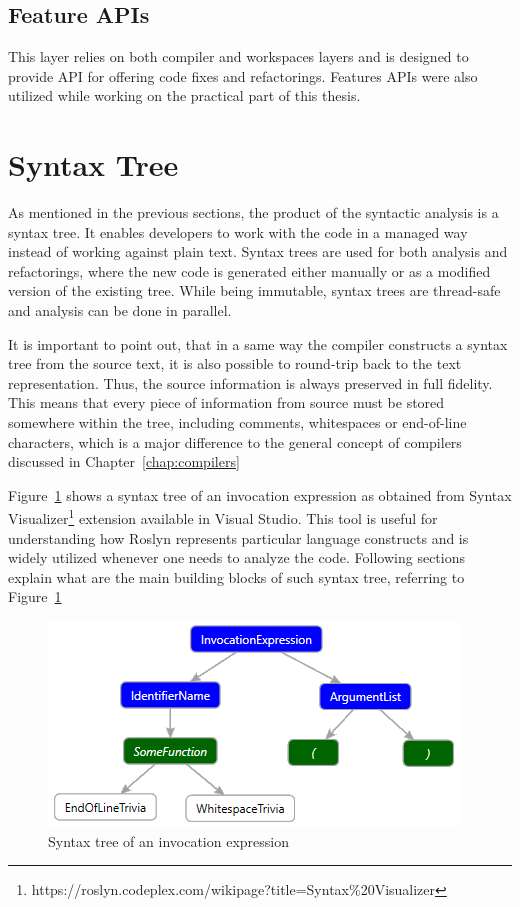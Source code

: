 \documentclass[
  digital, %
  table,   %
  lof,     %
  lot,     %
  oneside,
]{fithesis3}
\begin{document}
\subsection{Feature APIs}
This layer relies on both compiler and workspaces layers and is designed to provide API for offering code fixes and refactorings. Features APIs were also utilized while working on the practical part of this thesis.
  
\section{Syntax Tree}
As mentioned in the previous sections, the product of the syntactic analysis is a syntax tree. It enables developers to work with the code in a managed way instead of working against plain text. Syntax trees are used for both analysis and refactorings, where the new code is generated either manually or as a modified version of the existing tree. While being immutable, syntax trees are thread-safe and analysis can be done in parallel.

It is important to point out, that in a same way the compiler constructs a syntax tree from the source text, it is also possible to round-trip back to the text representation. Thus, the source information is always preserved in full fidelity. This means that every piece of information from source must be stored somewhere within the tree, including comments, whitespaces or end-of-line characters, which is a major difference to the general concept of compilers discussed in Chapter~\ref{chap:compilers}

Figure~\ref{fig:roslyn-syntax-tree} shows a syntax tree of an invocation expression as obtained from Syntax Visualizer\footnote{https://roslyn.codeplex.com/wikipage?title=Syntax\%20Visualizer} extension available in Visual Studio. This tool is useful for understanding how Roslyn represents particular language constructs and is widely utilized whenever one needs to analyze the code. Following sections explain what are the main building blocks of such syntax tree, referring to Figure~\ref{fig:roslyn-syntax-tree}

\begin{figure}[h!]
		\centering
			\includegraphics[scale=0.8]{img/roslyn-syntax-tree-2}
		\caption{Syntax tree of an invocation expression}
		\label{fig:roslyn-syntax-tree}
\end{figure}
\end{document}
